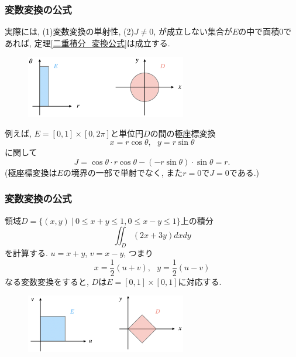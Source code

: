 \documentclass[dvipdfmx,cjk,10.2pt]{beamer}
\theoremstyle{definition}
\begin{document}
\begin{frame}
\frametitle{変数変換の公式}

 
実際には, (1)変数変換の単射性, (2)$J\ne 0$, が成立しない集合が$E$の中で面積$0$であれば, 定理\ref{二重積分_変換公式}は成立する. 

\begin{figure}[htbp]
 \begin{center} 
  \includegraphics[width=70mm]{polar_coord.png}
 \end{center}
\end{figure}
\vspace{-2mm}

例えば, $E=[0,1]\times [0,2\pi]$と単位円$D$の間の極座標変換
$$
x=r\cos \theta, \ \ \ y=r \sin \theta
$$
に関して
$$
J= \cos \theta \cdot r \cos \theta-(-r\sin \theta)\cdot \sin \theta = r. 
$$
(極座標変換は$E$の境界の一部で単射でなく, また$r=0$で$J=0$である.)

\end{frame}





\begin{frame}
\frametitle{変数変換の公式}

領域$D=\{(x,y) \ | \ 0 \le x+y \le 1, 0 \le x-y \le 1\}$上の積分
$$
\iint_D (2x+3y)dxdy
$$
を計算する. $u=x+y$, $v=x-y$, つまり
$$
x=\frac{1}{2}(u+v), \ \ \ y=\frac{1}{2}(u-v)
$$
なる変数変換をすると, $D$は$E=[0,1] \times [0,1]$に対応する. 
\vspace{-2mm}
\begin{figure}[htbp]
 \begin{center} 
  \includegraphics[width=70mm]{var_change.png}
 \end{center}
\end{figure}
\vspace{-2mm}

\end{frame}
\end{document}
